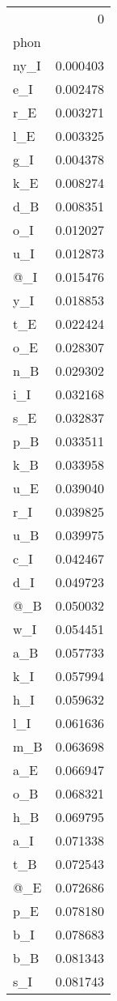 \begin{tabular}{lr}
\toprule
{} &         0 \\
phon &           \\
\midrule
ny\_I &  0.000403 \\
e\_I  &  0.002478 \\
r\_E  &  0.003271 \\
l\_E  &  0.003325 \\
g\_I  &  0.004378 \\
k\_E  &  0.008274 \\
d\_B  &  0.008351 \\
o\_I  &  0.012027 \\
u\_I  &  0.012873 \\
@\_I  &  0.015476 \\
y\_I  &  0.018853 \\
t\_E  &  0.022424 \\
o\_E  &  0.028307 \\
n\_B  &  0.029302 \\
i\_I  &  0.032168 \\
s\_E  &  0.032837 \\
p\_B  &  0.033511 \\
k\_B  &  0.033958 \\
u\_E  &  0.039040 \\
r\_I  &  0.039825 \\
u\_B  &  0.039975 \\
c\_I  &  0.042467 \\
d\_I  &  0.049723 \\
@\_B  &  0.050032 \\
w\_I  &  0.054451 \\
a\_B  &  0.057733 \\
k\_I  &  0.057994 \\
h\_I  &  0.059632 \\
l\_I  &  0.061636 \\
m\_B  &  0.063698 \\
a\_E  &  0.066947 \\
o\_B  &  0.068321 \\
h\_B  &  0.069795 \\
a\_I  &  0.071338 \\
t\_B  &  0.072543 \\
@\_E  &  0.072686 \\
p\_E  &  0.078180 \\
b\_I  &  0.078683 \\
b\_B  &  0.081343 \\
s\_I  &  0.081743 \\

\end{tabular}
